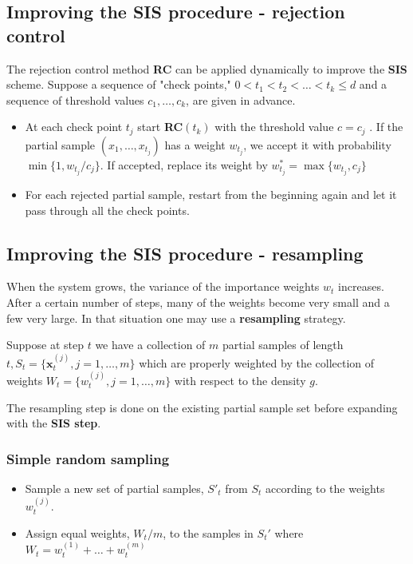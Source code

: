 \documentclass[times, utf8, diplomski]{fer}
\begin{document}
\subsection{Improving the SIS procedure - rejection control}
\label{SIS_RC}
The rejection control method \textbf{RC} can be applied dynamically to improve the  \textbf{SIS} scheme. Suppose a sequence of "check points," $0 < t_1 < t_2 < \ldots < t_k \leq d$ and a sequence of threshold values $c_1, \ldots, c_k$, are given in advance. 
\begin{itemize}
\item{At each check point $t_j$ start \textbf{RC}$(t_k)$ with the threshold value $c = c_j$ . If the partial sample $(x_1, \ldots, x_{t_j})$ has a weight $w_{t_j}$, we accept it with probability $\min \{ 1, w_{t_j}/c_j \}$. If accepted, replace its weight by $w^{*}_{t_j} = \max \{ w_{t_j}, c_j \}$}
\item{For each rejected partial sample, restart from the beginning again and let it pass through all the check points.}
\end{itemize}

\subsection{Improving the SIS procedure - resampling}
When the system grows, the variance of the importance weights $w_t$ increases. After a certain number of steps, many of the weights become very small and a few very large. In that situation one may use a \textbf{resampling} strategy. 

Suppose at step $t$ we have a collection of $m$ partial samples of length $t, S_t = \{ \mathbf{x}_{t}^{(j)}, j = 1, \ldots, m \}$ which are properly weighted by the collection of weights $W_t = \{w_t^{(j)}, j = 1, \ldots, m\}$ with respect to the density $g$.

The resampling step is done on the existing partial sample set before expanding with the \textbf{SIS step}.

\subsubsection{Simple random sampling}
\begin{itemize}
\item{Sample a new set of partial samples, $S'_t$ from $S_t$ according to the weights $w_t^{(j)}$.}
\item{Assign equal weights, $W_t / m$, to the samples in $S_t'$ where $W_t = w_t^{(1)} + \ldots + w_t^{(m)}$}
\end{itemize}
\end{document}
